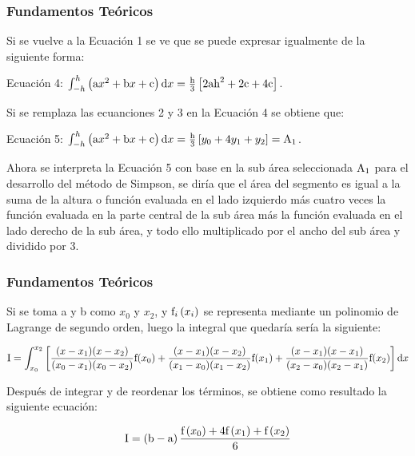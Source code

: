 \documentclass{beamer}
\begin{document}
\begin{frame}
\frametitle{Fundamentos Teóricos}

	
	Si se vuelve a la Ecuación 1 se ve que se puede expresar igualmente de la siguiente forma:
	
	Ecuación 4: $ \int_{-h}^{h}\left(\textup{a}x^2 + \textup{b}x + \textup{c}\right)\textup{d}x = \frac{\textup{h}}
	{3}\left[2\textup{a}\textup{h}^2 + 2\textup{c} + 4\textup{c}\right] $.

		
	Si se remplaza las ecuanciones 2 y 3 en la Ecuación 4 se obtiene que:

	
	Ecuación 5: $ \int_{-h}^{h}\left(\textup{a}x^2 + \textup{b}x + \textup{c}\right)\textup{d}x = \frac{\textup{h}}{3}\left[y_{0} + 
	4y_{1} + y_{2}\right] = \textup{A}_{1}  $.

	Ahora se interpreta la Ecuación 5 con base en la sub área seleccionada $\textup{A}_{1}$ para el desarrollo del método de Simpson, se diría que el área del segmento es igual a la suma de la altura o función evaluada en el lado izquierdo más cuatro veces la función evaluada en la parte central de la sub área más la función evaluada en el lado derecho de la sub área, y todo ello multiplicado por el ancho del sub área y dividido por 3.

\end{frame}

\begin{frame}
\frametitle{Fundamentos Teóricos}

	
	Si se toma a y b como $ x_{0} $ y $ x_{2} $, y $ \textup{f}_{i}\left(x_{i}\right) $ se representa mediante un polinomio de Lagrange de segundo orden, luego la integral que quedaría sería la siguiente:
	
	\[ \textup{I} = \int_{x_{0}}^{x_{2}}\left[\frac{(x - x_{1})(x - x_{2})}{(x_{0} - x_{1})(x_{0} - x_{2})}\textup{f}(x_{0}) + \frac{(x 
	- x_{1})(x - x_{2})}{(x_{1} - x_{0})(x_{1} - x_{2})}\textup{f}(x_{1}) + \frac{(x - x_{1})(x - x_{1})}{(x_{2} - x_{0})(x_{2} - 
	x_{1})}\textup{f}(x_{2})\right]\textup{d}x\]	
	
	Después de integrar y de reordenar los términos, se obtiene como resultado la siguiente ecuación:
	
	\[\textup{I} = \left(\textup{b}-\textup{a}\right)\frac{\textup{f}\left(x_{0}\right) + 4\textup{f}\left(x_{1}\right) + \textup{f}\left(x_{2}\right)}{6}\]

\end{frame}
\end{document}
